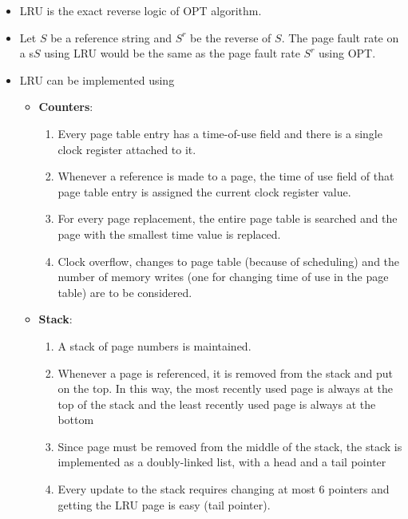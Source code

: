 \documentclass{article}
\theoremstyle{plain}
\theoremstyle{definition}
\begin{document}
\begin{itemize}
    \item LRU is the exact reverse logic of OPT algorithm. 
    
    \item Let $S$ be  a reference string and $S^r$ be the reverse of $S$. The page fault rate on a s$S$ using LRU would be the same as the page fault rate $S^r$ using OPT.
    
    \item LRU can be implemented using
    \begin{itemize}
        \item \textbf{Counters}: 
        \begin{enumerate}
            \item Every page table entry has a time-of-use field and there is a single clock register attached to it.
            
            \item  Whenever a reference is made to a page, the time of use field of that page table entry is assigned the current clock register value. 
            
            \item For every page replacement, the entire page table is searched and the page with the smallest time value is replaced.
            
            \item Clock overflow, changes to page table (because of scheduling) and the number of memory writes (one for changing time of use in the page table) are to be considered.
        \end{enumerate}
        
        \item \textbf{Stack}:
        \begin{enumerate}
            \item A stack of page numbers is maintained. 
            
            \item Whenever a page is referenced, it is removed from the stack and put on the top. In this way, the most recently used page is always at the top of the stack and the least recently used page is always at the bottom
            
            \item Since page must be removed from the middle of the stack, the stack is implemented as a doubly-linked list, with a head and a tail pointer
            
            \item Every update to the stack requires changing at most 6 pointers and getting the LRU page is easy (tail pointer). 
        \end{enumerate}
    \end{itemize}
\end{itemize}
\end{document}
